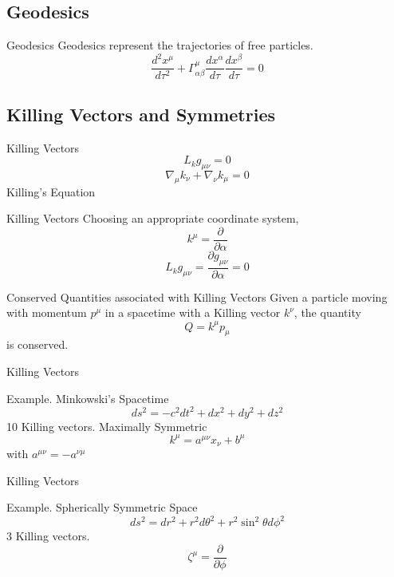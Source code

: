 \documentclass{beamer}
\begin{document}
\begin{darkframes}
   	\subsection{Geodesics}
    \begin{frame}{Geodesics}
    	Geodesics represent the trajectories of free particles.
        $$ \frac{d^2 x^\mu}{d \tau^2} + \Gamma^\mu_{\alpha \beta} \frac{dx^\alpha}{d\tau} \frac{dx^\beta}{d\tau} = 0 $$
    \end{frame}
	
    \subsection{Killing Vectors and Symmetries}
    \begin{frame}{Killing Vectors}  
    	$$ L_k g_{\mu \nu}  = 0 $$
        \pause
        $$ \nabla_\mu k_\nu + \nabla_\nu k_\mu = 0 $$
        \centering
        {Killing's Equation}        
	\end{frame}
    
    \begin{frame}{Killing Vectors}  
    	Choosing an appropriate coordinate system, 
        $$ k^\mu = \frac{\partial}{\partial \alpha} $$
        \pause
        $$ L_k g_{\mu \nu}  = \frac{\partial g_{\mu \nu}}{\partial \alpha} = 0 $$
	\end{frame}
    
    \begin{frame}{Conserved Quantities associated with Killing Vectors}  
        Given a particle moving with momentum $p^\mu$ in a spacetime with a Killing vector $k^\nu$, the quantity
        $$ Q= k^\mu p_\mu $$
        is conserved.
	\end{frame}
    
    \begin{frame}{Killing Vectors}  
   		\begin{block}{Example. Minkowski's Spacetime}
        	$$ ds^{2} = - c^{2} dt^{2} + dx^{2} + dy^{2} + dz^{2}$$
            10 Killing vectors. \alert{Maximally Symmetric} 
            $$ k^\mu = a^{\mu \nu} x_\nu + b^\mu $$
            with $ a^{\mu \nu} = -a^{\nu \mu}$
      	\end{block}
	\end{frame}
    
    \begin{frame}{Killing Vectors}  
   		\begin{block}{Example. Spherically Symmetric Space}
        	$$ ds^2 = dr^2 + r^2 d\theta^2 + r^2 \sin^2 \theta d\phi^{2}$$
            3 Killing vectors. 
            $$ \zeta^\mu = \frac{\partial}{\partial \phi} $$            
      	\end{block}
	\end{frame}


\end{darkframes}
\end{document}
